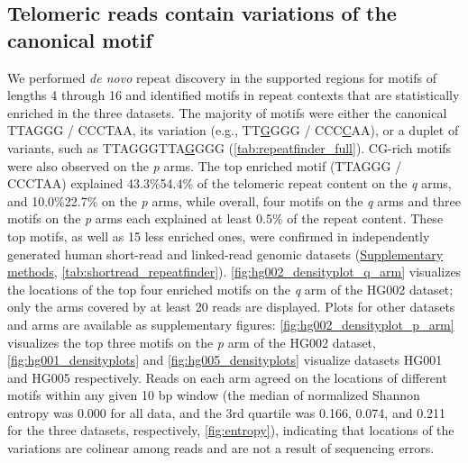 \documentclass{article}
\begin{document}
\subsection*{Telomeric reads contain variations of the canonical motif}
We performed \textit{de novo} repeat discovery in the supported regions for motifs of lengths 4 through 16 and identified motifs in repeat contexts that are statistically enriched in the three datasets.
The majority of motifs were either the canonical TTAGGG / CCCTAA, its variation (e.g., TT\underline{G}GGG / CCC\underline{C}AA), or a duplet of variants, such as TTAGGGTTA\underline{G}GGG (\autoref{tab:repeatfinder_full}).
CG-rich motifs were also observed on the \textit{p} arms.
The top enriched motif (TTAGGG / CCCTAA) explained 43.3\%\textendash{}54.4\% of the telomeric repeat content on the \textit{q} arms, and 10.0\%\textendash{}22.7\% on the \textit{p} arms, while overall, four motifs on the \textit{q} arms and three motifs on the \textit{p} arms each explained at least 0.5\% of the repeat content.
These top motifs, as well as 15 less enriched ones, were confirmed in independently generated human short-read and linked-read genomic datasets (\hyperref[sec:supp_methods]{Supplementary methods}, \autoref{tab:shortread_repeatfinder}).
\autoref{fig:hg002_densityplot_q_arm} visualizes the locations of the top four enriched motifs on the \textit{q} arm of the HG002 dataset; only the arms covered by at least 20 reads are displayed.
Plots for other datasets and arms are available as supplementary figures: \autoref{fig:hg002_densityplot_p_arm} visualizes the top three motifs on the \textit{p} arm of the HG002 dataset, \autoref{fig:hg001_densityplots} and \autoref{fig:hg005_densityplots} visualize datasets HG001 and HG005 respectively.
Reads on each arm agreed on the locations of different motifs within any given 10 bp window (the median of normalized Shannon entropy was 0.000 for all data, and the 3rd quartile was 0.166, 0.074, and 0.211 for the three datasets, respectively, \autoref{fig:entropy}), indicating that locations of the variations are colinear among reads and are not a result of sequencing errors.
\end{document}
